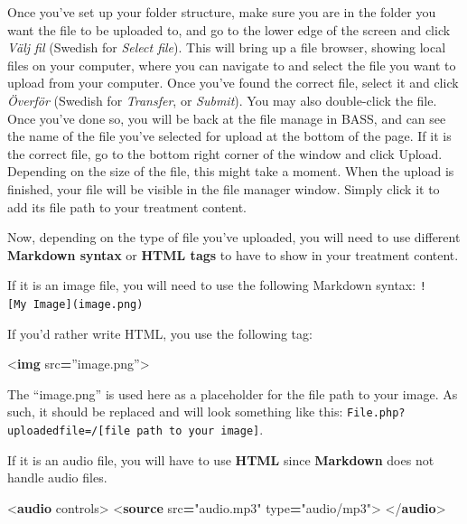 \documentclass[
]{book}
\newenvironment{Shaded}{\begin{snugshade}}{\end{snugshade}}
\newcommand{\DataTypeTok}[1]{\textcolor[rgb]{0.13,0.29,0.53}{#1}}
\newcommand{\KeywordTok}[1]{\textcolor[rgb]{0.13,0.29,0.53}{\textbf{#1}}}
\newcommand{\OperatorTok}[1]{\textcolor[rgb]{0.81,0.36,0.00}{\textbf{#1}}}
\newcommand{\OtherTok}[1]{\textcolor[rgb]{0.56,0.35,0.01}{#1}}
\newcommand{\StringTok}[1]{\textcolor[rgb]{0.31,0.60,0.02}{#1}}
\begin{document}
Once you've set up your folder structure, make sure you are in the folder you want the file to be uploaded to, and go to the lower edge of the screen and click \emph{Välj fil} (Swedish for \emph{Select file}). This will bring up a file browser, showing local files on your computer, where you can navigate to and select the file you want to upload from your computer. Once you've found the correct file, select it and click \emph{Överför} (Swedish for \emph{Transfer}, or \emph{Submit}). You may also double-click the file. Once you've done so, you will be back at the file manage in BASS, and can see the name of the file you've selected for upload at the bottom of the page. If it is the correct file, go to the bottom right corner of the window and click Upload. Depending on the size of the file, this might take a moment. When the upload is finished, your file will be visible in the file manager window. Simply click it to add its file path to your treatment content.

Now, depending on the type of file you've uploaded, you will need to use different \textbf{Markdown syntax} or \textbf{HTML tags} to have to show in your treatment content.

If it is an image file, you will need to use the following Markdown syntax:
\texttt{!{[}My\ Image{]}(image.png)}

If you'd rather write HTML, you use the following tag:

\begin{Shaded}
\begin{Highlighting}[]
\DataTypeTok{\textless{}}\KeywordTok{img}\OtherTok{ src}\OperatorTok{=}\StringTok{”image.png”}\DataTypeTok{\textgreater{}}
\end{Highlighting}
\end{Shaded}

The ``image.png'' is used here as a placeholder for the file path to your image. As such, it should be replaced and will look something like this: \texttt{File.php?uploadedfile=/{[}file\ path\ to\ your\ image{]}}.

If it is an audio file, you will have to use \textbf{HTML} since \textbf{Markdown} does not handle audio files.

\begin{Shaded}
\begin{Highlighting}[]
\DataTypeTok{\textless{}}\KeywordTok{audio}\OtherTok{ controls}\DataTypeTok{\textgreater{}}
  \DataTypeTok{\textless{}}\KeywordTok{source}\OtherTok{ src}\OperatorTok{=}\StringTok{"audio.mp3"}\OtherTok{ type}\OperatorTok{=}\StringTok{"audio/mp3"}\DataTypeTok{\textgreater{}}
\DataTypeTok{\textless{}/}\KeywordTok{audio}\DataTypeTok{\textgreater{}}
\end{Highlighting}
\end{Shaded}
\end{document}
